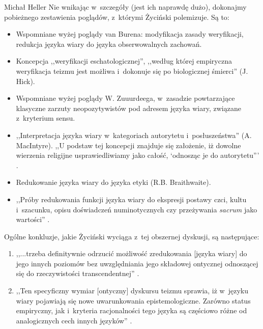 \begin{artplenv}{Michał Heller}
Nie wnikając w~szczegóły (jest ich naprawdę dużo), dokonajmy pobieżnego zestawienia poglądów, z~którymi Życiński polemizuje. Są to:

\begin{itemize}
\item Wspomniane wyżej poglądy van Burena: modyfikacja zasady weryfikacji, redukcja języka wiary do języka obserwowalnych zachowań.
\item Koncepcja ,,weryfikacji eschatologicznej'', ,,według której empiryczna weryfikacja teizmu jest możliwa i~dokonuje się po biologicznej śmierci''
\parencite[][s.~27]{zycinski_teizm_1985} %
 (J. Hick).
\item Wspomniane wyżej poglądy W. Zuuurdeega, w~zasadzie powtarzające klasyczne zarzuty neopozytywistów pod adresem języka wiary, związane z~kryterium sensu.
\item ,,Interpretacja języka wiary w~kategoriach autorytetu i~posłuszeństwa'' (A. MacIntyre). ,,U podstaw tej koncepcji znajduje się założenie, iż dowolne wierzenia religijne usprawiedliwiamy jako całość, ‘odnosząc je do autorytetu'''
\parencite[][s.~29]{zycinski_teizm_1985}.%

\item Redukowanie języka wiary do języka etyki (R.B. Braithwaite).
\item ,,Próby redukowania funkcji języka wiary do ekspresji postawy czci, kultu i~szacunku, opisu doświadczeń numinotycznych czy przeżywania \textit{sacrum} jako wartości''
\parencite[][s.~31]{zycinski_teizm_1985}.%

\end{itemize}
Ogólne konkluzje, jakie Życiński wyciąga z~tej obszernej dyskusji, są następujące:

\begin{enumerate}
\item ,,...trzeba definitywnie odrzucić możliwość zredukowania [języka wiary] do jego innych poziomów bez uwzględniania jego składowej ontycznej odnoszącej się do rzeczywistości transcendentnej''
\parencite[][s.~32]{zycinski_teizm_1985}.%

\item ,,Ten specyficzny wymiar [ontyczny] dyskursu teizmu sprawia, iż w~języku wiary pojawiają się nowe uwarunkowania epistemologiczne. Zarówno status empiryczny, jak i~kryteria racjonalności tego języka są częściowo różne od analogicznych cech innych języków''
\parencite[][s.~32]{zycinski_teizm_1985}.%


\end{enumerate}
\end{artplenv}
